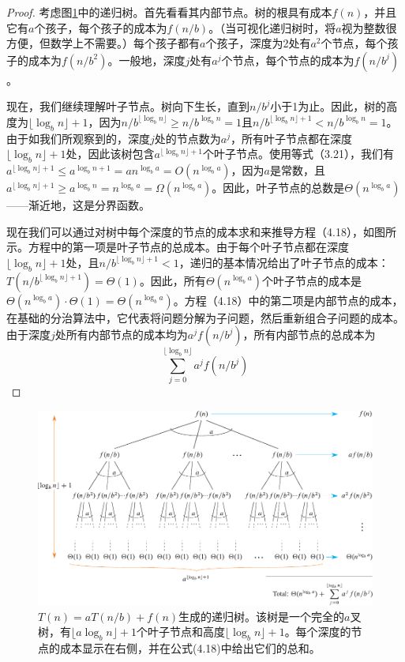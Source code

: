 \documentclass[lang=cn,newtx,10pt,scheme=chinese]{elegantbook}
\begin{document}
\begin{proof}
考虑图\ref{fig:4-3}中的递归树。首先看看其内部节点。树的根具有成本$f(n)$，并且它有$a$个孩子，每个孩子的成本为$f(n/b)$。（当可视化递归树时，将$a$视为整数很方便，但数学上不需要。）每个孩子都有$a$个孩子，深度为2处有$a^2$个节点，每个孩子的成本为$f(n/b^2)$。一般地，深度$j$处有$a^j$个节点，每个节点的成本为$f(n/b^j)$。

现在，我们继续理解叶子节点。树向下生长，直到$n/b^j$小于1为止。因此，树的高度为$\lfloor\log _b n\rfloor+1$，因为$n / b^{\lfloor\log _b n\rfloor} \geq n / b^{\log _b n}=1$且$n / b^{\lfloor\log _b n\rfloor+1}<n / b^{\log _b n}=1$。由于如我们所观察到的，深度$j$处的节点数为$a^j$，所有叶子节点都在深度$\lfloor\log _b n\rfloor+1$处，因此该树包含$a^{\lfloor\log _b n\rfloor+1}$个叶子节点。使用等式（3.21），我们有$a^{\lfloor\log _b n\rfloor+1} \leq a^{\log _b n+1}=a n^{\log _b a}=O(n^{\log _b a})$，因为$a$是常数，且$a^{\lfloor\log _b n\rfloor+1} \geq a^{\log _b n}=n^{\log _b a}=\Omega(n^{\log _b a})$。因此，叶子节点的总数是$\Theta(n^{\log _b a})$——渐近地，这是分界函数。

现在我们可以通过对树中每个深度的节点的成本求和来推导方程（4.18），如图所示。方程中的第一项是叶子节点的总成本。由于每个叶子节点都在深度$\lfloor\log _b n\rfloor+1$处，且$n / b^{\lfloor\log _b n\rfloor+1}<1$，递归的基本情况给出了叶子节点的成本：$T(n / b^{\lfloor\log _b n\rfloor+1})=\Theta(1)$。因此，所有$\Theta(n^{\log _b a})$个叶子节点的成本是$\Theta(n^{\log _b a}) \cdot \Theta(1)=\Theta(n^{\log _b a})$。方程（4.18）中的第二项是内部节点的成本，在基础的分治算法中，它代表将问题分解为子问题，然后重新组合子问题的成本。由于深度$j$处所有内部节点的成本均为$a^j f(n / b^j)$，所有内部节点的总成本为
$$
\sum_{j=0}^{\lfloor\log _b n\rfloor} a^j f(n / b^j)
$$
\end{proof}

\begin{figure}[htbp]
    \centering
    \includegraphics{算法导论第四版插图/第四章/4-3.pdf}
    \caption{$T(n)=aT(n/b)+f(n)$生成的递归树。该树是一个完全的$a$叉树，有$\lfloor a \log _b n\rfloor+1$个叶子节点和高度$\lfloor\log _b n\rfloor+1$。每个深度的节点的成本显示在右侧，并在公式(4.18)中给出它们的总和。}
    \label{fig:4-3}
\end{figure}
\end{document}
